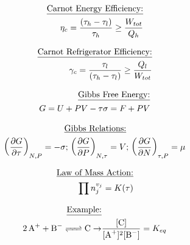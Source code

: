 \documentclass[12pt]{article}
\begin{document}
\begin{multicols}{2}

  \begin{equation*}
    \begin{split}
    \text{\underline{Carnot Energy Efficiency:}}\\
    \eta_c=\frac{(\tau_h-\tau_l)}{\tau_h}\geq\frac{W_{tot}}{Q_{h}}
    \end{split}
  \end{equation*}

  \begin{equation*}
    \begin{split}
    \text{\underline{Carnot Refrigerator Efficiency:}}\\
    \gamma_c=\frac{\tau_l}{(\tau_h-\tau_l)}\geq\frac{Q_{l}}{W_{tot}}
    \end{split}
  \end{equation*}

\end{multicols}

\begin{multicols}{2}

  \begin{equation*}
    \begin{split}
    \text{\underline{Gibbs Free Energy:}}\\
    G=U+PV-\tau\sigma=F+PV
    \end{split}
  \end{equation*}

  \begin{equation*}
    \begin{split}
    \text{\underline{Gibbs Relations:}}&\\
    \left( \frac{\partial G}{\partial\tau} \right)_{N,P}=-\sigma;\,\left( \frac{\partial G}{\partial P} \right)_{N,\tau}=V&;\,\left( \frac{\partial G}{\partial N} \right)_{\tau,P}=\mu
    \end{split}
  \end{equation*}

\end{multicols}

\begin{multicols}{2}

  \begin{equation*}
    \begin{split}
    \text{\underline{Law of Mass Action:}}\\
    \prod n_j^{v_j}=K(\tau)
    \end{split}
  \end{equation*}

  \begin{equation*}
    \begin{split}
    \text{\underline{Example:}}&\\
    \ce{2A^+ + B^- <=> C}\to &\frac{[\ce{C}]}{[\ce{A^+}]^2[\ce{B^-}]}=K_{eq}
    \end{split}
  \end{equation*}

\end{multicols}
\end{document}
